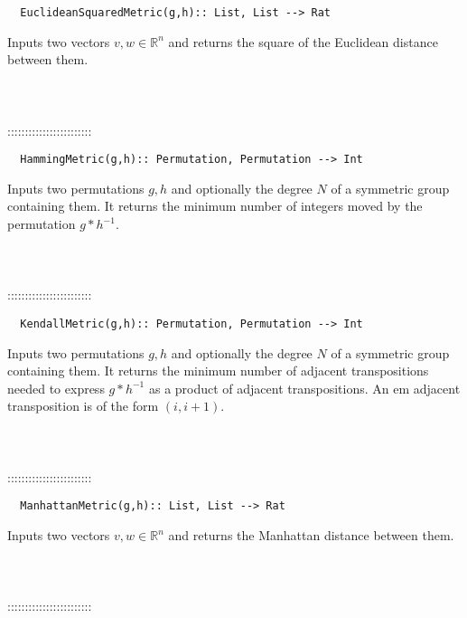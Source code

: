 \documentclass[a4paper,11pt]{report}
\begin{document}
{\begin{verbatim}  EuclideanSquaredMetric(g,h):: List, List --> Rat
\end{verbatim}


 

 Inputs two vectors $v,w \in \mathbb R^n$ and returns the square of the Euclidean distance between them. \\
 \\
 \\
 \\
 ::::::::::::::::::::::::\\
 
\begin{verbatim}  HammingMetric(g,h):: Permutation, Permutation --> Int
\end{verbatim}


 

 Inputs two permutations $g,h$ and optionally the degree $N$ of a symmetric group containing them. It returns the minimum number of
integers moved by the permutation $g*h^{-1}$. \\
 \\
 \\
 \\
 ::::::::::::::::::::::::\\
 
\begin{verbatim}  KendallMetric(g,h):: Permutation, Permutation --> Int
\end{verbatim}


 

 Inputs two permutations $g,h$ and optionally the degree $N$ of a symmetric group containing them. It returns the minimum number of
adjacent transpositions needed to express $g*h^{-1}$ as a product of adjacent transpositions. An
\texttt{}\texttt{}em adjacent\texttt{}
transposition is of the form $(i,i+1)$. \\
 \\
 \\
 \\
 ::::::::::::::::::::::::\\
 
\begin{verbatim}  ManhattanMetric(g,h):: List, List --> Rat
\end{verbatim}


 

 Inputs two vectors $v,w \in \mathbb R^n$ and returns the Manhattan distance between them. \\
 \\
 \\
 \\
 ::::::::::::::::::::::::\\
 
}
\end{document}
